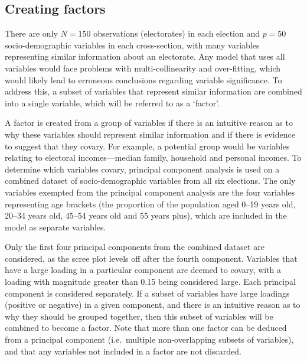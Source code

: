 \documentclass[
  times, doublespace]{anzsauth}
\begin{document}
\hypertarget{creating-factors}{%
\subsection{Creating factors}\label{creating-factors}}

There are only \(N = 150\) observations (electorates) in each election and \(p = 50\) socio-demographic variables in each cross-section, with many variables representing similar information about an electorate. Any model that uses all variables would face problems with multi-collinearity and over-fitting, which would likely lead to erroneous conclusions regarding variable significance. To address this, a subset of variables that represent similar information are combined into a single variable, which will be referred to as a `factor'.

A factor is created from a group of variables if there is an intuitive reason as to why these variables should represent similar information and if there is evidence to suggest that they covary. For example, a potential group would be variables relating to electoral incomes---median family, household and personal incomes. To determine which variables covary, principal component analysis is used on a combined dataset of socio-demographic variables from all six elections. The only variables exempted from the principal component analysis are the four variables representing age brackets (the proportion of the population aged 0--19 years old, 20--34 years old, 45--54 years old and 55 years plus), which are included in the model as separate variables.

Only the first four principal components from the combined dataset are considered, as the scree plot levels off after the fourth component. Variables that have a large loading in a particular component are deemed to covary, with a loading with magnitude greater than 0.15 being considered large. Each principal component is considered separately. If a subset of variables have large loadings (positive or negative) in a given component, and there is an intuitive reason as to why they should be grouped together, then this subset of variables will be combined to become a factor. Note that more than one factor can be deduced from a principal component (i.e.~multiple non-overlapping subsets of variables), and that any variables not included in a factor are not discarded.
\end{document}
